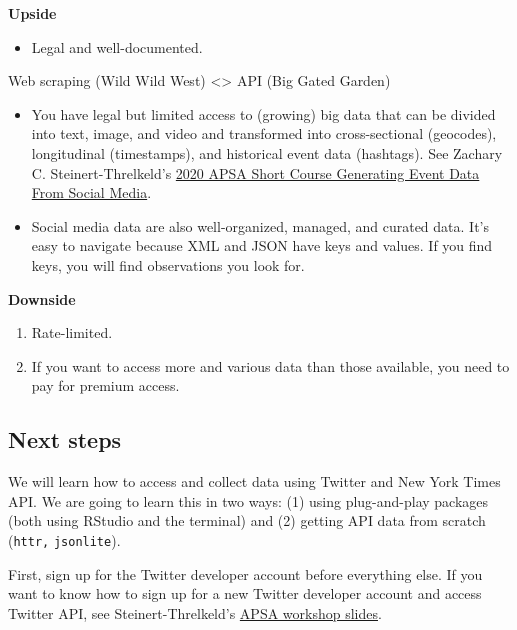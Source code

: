 \documentclass[
]{book}
\providecommand{\tightlist}{%
  \setlength{\itemsep}{0pt}\setlength{\parskip}{0pt}}
\begin{document}
\textbf{Upside}

\begin{itemize}
\tightlist
\item
  Legal and well-documented.
\end{itemize}

Web scraping (Wild Wild West) \textless\textgreater{} API (Big Gated Garden)

\begin{itemize}
\item
  You have legal but limited access to (growing) big data that can be divided into text, image, and video and transformed into cross-sectional (geocodes), longitudinal (timestamps), and historical event data (hashtags). See Zachary C. Steinert-Threlkeld's \href{https://github.com/ZacharyST/APSA2020_EventDataFromSocialMedia}{2020 APSA Short Course Generating Event Data From Social Media}.
\item
  Social media data are also well-organized, managed, and curated data. It's easy to navigate because XML and JSON have keys and values. If you find keys, you will find observations you look for.
\end{itemize}

\textbf{Downside}

\begin{enumerate}
\def\labelenumi{\arabic{enumi}.}
\item
  Rate-limited.
\item
  If you want to access more and various data than those available, you need to pay for premium access.
\end{enumerate}

\subsection{Next steps}\label{next-steps}

We will learn how to access and collect data using Twitter and New York Times API. We are going to learn this in two ways: (1) using plug-and-play packages (both using RStudio and the terminal) and (2) getting API data from scratch (\texttt{httr,} \texttt{jsonlite}).

First, sign up for the Twitter developer account before everything else. If you want to know how to sign up for a new Twitter developer account and access Twitter API, see Steinert-Threlkeld's \href{https://github.com/ZacharyST/APSA2020_EventDataFromSocialMedia/blob/master/Presentation/02_AccessTwitter.pdf}{APSA workshop slides}.
\end{document}
